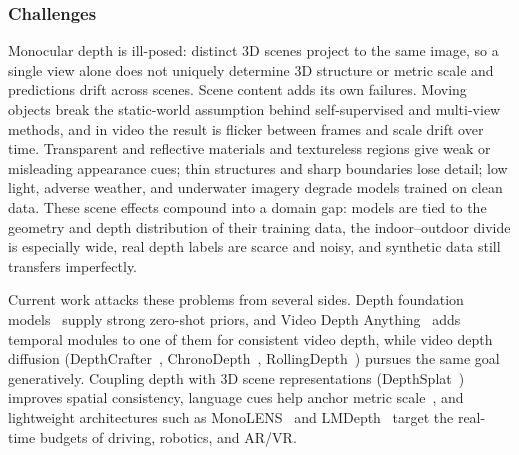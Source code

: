 \subsubsection{Challenges}
Monocular depth is ill-posed: distinct 3D scenes project to the same image, so a single view alone does not uniquely determine 3D structure or metric scale and predictions drift across scenes. Scene content adds its own failures. Moving objects break the static-world assumption behind self-supervised and multi-view methods, and in video the result is flicker between frames and scale drift over time. Transparent and reflective materials and textureless regions give weak or misleading appearance cues; thin structures and sharp boundaries lose detail; low light, adverse weather, and underwater imagery degrade models trained on clean data. These scene effects compound into a domain gap: models are tied to the geometry and depth distribution of their training data, the indoor--outdoor divide is especially wide, real depth labels are scarce and noisy, and synthetic data still transfers imperfectly.

Current work attacks these problems from several sides. Depth foundation models~\cite{DepthAnything,UniDepth,zoedepth} supply strong zero-shot priors, and Video Depth Anything~\cite{chen2025video} adds temporal modules to one of them for consistent video depth, while video depth diffusion (DepthCrafter~\cite{hu2025depthcrafter}, ChronoDepth~\cite{shao2025learning}, RollingDepth~\cite{ke2025video}) pursues the same goal generatively. Coupling depth with 3D scene representations (DepthSplat~\cite{xu2024depthsplat}) improves spatial consistency, language cues help anchor metric scale~\cite{zeng2024rsa}, and lightweight architectures such as MonoLENS~\cite{higashiuchi2025monolens} and LMDepth~\cite{long2025lmdepth} target the real-time budgets of driving, robotics, and AR/VR.




